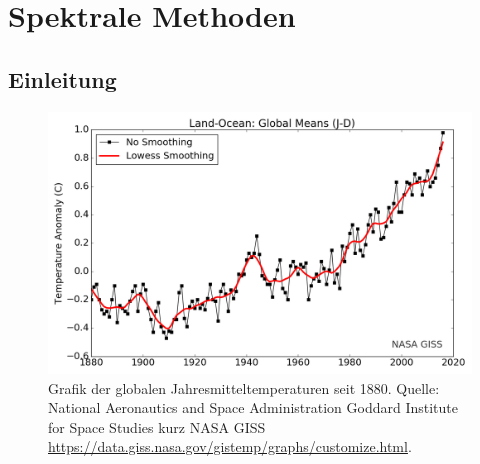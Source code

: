 \chapter{Spektrale Methoden\label{chapter:klima}}
\begin{refsection}



\section{Einleitung
\label{klima:section:einleitung}}

\begin{figure}
\centering
\includegraphics[width=\hsize]{klima/nasa_giss.png}
\caption{Grafik der globalen Jahresmitteltemperaturen seit 1880. Quelle: National Aeronautics and Space Administration Goddard Institute for Space Studies kurz NASA GISS \url{https://data.giss.nasa.gov/gistemp/graphs/customize.html}.
\label{klima:einleitung:nasa}}
\end{figure}


\end{refsection}
